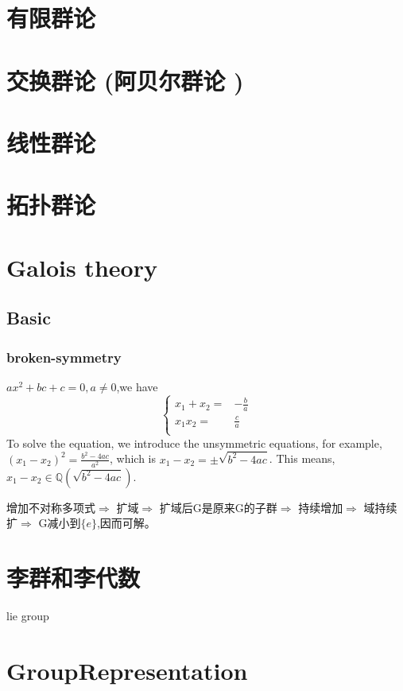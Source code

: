 \documentclass[UTF8]{../../09-Mathematics}
\begin{document}
\chapter{有限群论}
\chapter{交换群论 (阿贝尔群论 )}
\chapter{线性群论}
\chapter{拓扑群论}


\chapter{Galois theory}

\section{Basic}
\subsection{broken-symmetry}
$ax^2+bc+c=0,a\neq0$,we have
$$
\left\{
    \begin{aligned}
        x_1+x_2=&-\frac{b}{a}\\
        x_1x_2=&\frac{c}{a}\\
    \end{aligned}
\right.
$$
To solve the equation, we introduce the unsymmetric equations, for example, $(x_1-x_2)^2=\frac{b^2-4ac}{a^2}$, which is $x_1-x_2=\pm \sqrt{b^2-4ac}$. This means, $x_1-x_2 \in \mathbb Q( \sqrt{b^2-4ac})$.

增加不对称多项式$\Longrightarrow $
扩域$\Longrightarrow $
扩域后G是原来G的子群$\Longrightarrow $
持续增加$\Longrightarrow $
域持续扩$\Longrightarrow $
G减小到$\{e\}$,因而可解。

\chapter{李群和李代数}
lie group



\chapter{GroupRepresentation}
\end{document}
